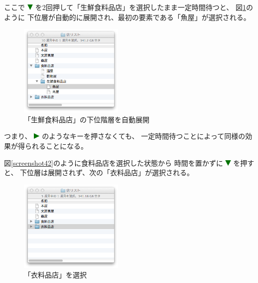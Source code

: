 \documentclass[twoside]{wiss}
\def\figwidth{50mm}
\def\down{ \includegraphics[width=3mm,bb=0 0 36 36]{figures/downtriangle.pdf} }
\def\right{ \includegraphics[width=3mm,bb=0 0 36 36]{figures/righttriangle.pdf} }
\begin{document}
\noindent
ここで{\down}を2回押して「生鮮食料品店」を選択したまま一定時間待つと、
図\ref{screenshot8}のように
下位層が自動的に展開され、最初の要素である「魚屋」が選択される。

\begin{figure}[H]
\centerline{\includegraphics[width=\figwidth,bb=0 0 344 304]{figures/1b1955309d3baefda8e1b614cf06df62.png}}
\caption{「生鮮食料品店」の下位階層を自動展開}
\label{screenshot8}
\end{figure}

\noindent
つまり、{\right}のようなキーを押さなくても、
一定時間待つことによって同様の効果が得られることになる。

図\ref{screenshot42}のように食料品店を選択した状態から
時間を置かずに{\down}を押すと、
下位層は展開されず、次の「衣料品店」が選択される。

\begin{figure}[H]
\centerline{\includegraphics[width=\figwidth,bb=0 0 344 304]{figures/c5c757d8f79d5a8a9c85eef25600ba66.png}}
\caption{「衣料品店」を選択}
\label{screenshot9}
\end{figure}
\end{document}
